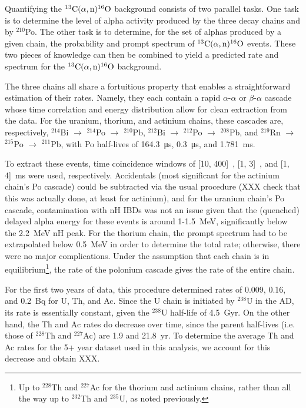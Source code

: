 \documentclass[../thesis.tex]{subfiles}
\begin{document}
Quantifying the $^{13}\mathrm{C}(\alpha, \mathrm{n})^{16}\mathrm{O}$ background consists of two parallel tasks. One task is to determine the level of alpha activity produced by the three decay chains and by $^{210}$Po. The other task is to determine, for the set of alphas produced by a given chain, the probability and prompt spectrum of $^{13}\mathrm{C}(\alpha, \mathrm{n})^{16}\mathrm{O}$ events. These two pieces of knowledge can then be combined to yield a predicted rate and spectrum for the $^{13}\mathrm{C}(\alpha, \mathrm{n})^{16}\mathrm{O}$ background.

The three chains all share a fortuitious property that enables a straightforward estimation of their rates. Namely, they each contain a rapid $\alpha$-$\alpha$ or $\beta$-$\alpha$ cascade whose time correlation and energy distribution allow for clean extraction from the data. For the uranium, thorium, and actinium chains, these cascades are, respectively, $^{214}$Bi $\to$ $^{214}$Po $\to$ $^{210}$Pb, $^{212}$Bi $\to$ $^{212}$Po $\to$ $^{208}$Pb, and $^{219}$Rn $\to$ $^{215}$Po $\to$ $^{211}$Pb, with Po half-lives of \SI{164.3}{\micro s}, \SI{0.3}{\micro s}, and \SI{1.781}{ms}.

To extract these events, time coincidence windows of [10, 400]~\us, [1, 3]~\us, and [1, 4]~ms were used, respectively. Accidentals (most significant for the actinium chain's Po cascade) could be subtracted via the usual procedure (XXX check that this was actually done, at least for actinium), and for the uranium chain's Po cascade, contamination with nH IBDs was not an issue given that the (quenched) delayed alpha energy for these events is around 1-1.5~MeV, significantly below the 2.2~MeV nH peak. For the thorium chain, the prompt spectrum had to be extrapolated below 0.5~MeV in order to determine the total rate; otherwise, there were no major complications. Under the assumption that each chain is in equilibrium\footnote{Up to $^{228}$Th and $^{227}$Ac for the thorium and actinium chains, rather than all the way up to $^{232}$Th and $^{235}$U, as noted previously.}, the rate of the polonium cascade gives the rate of the entire chain.

For the first two years of data, this procedure determined rates of 0.009, 0.16, and 0.2~Bq for U, Th, and Ac. Since the U chain is initiated by $^{238}$U in the AD, its rate is essentially constant, given the $^{238}$U half-life of 4.5~Gyr. On the other hand, the Th and Ac rates do decrease over time, since the parent half-lives (i.e. those of $^{228}$Th and $^{227}$Ac) are 1.9 and 21.8~yr. To determine the average Th and Ac rates for the 5+ year dataset used in this analysis, we account for this decrease and obtain XXX.
\end{document}
